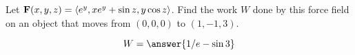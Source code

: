 \documentclass{ximera}
\author{David Guichard \and Neal Koblitz \and H. Jerome Keisler \and Albert Scheller \and Barry Balof \and Mike Wills \and Matthew Carr}
\begin{document}
\begin{exercise}




Let $\mathbf{F}(x,y,z)=\left\langle e^y,xe^y+\sin z,y\cos z\right\rangle$. Find the work $W$ done by this force field on an object that moves from $(0,0,0)$ to $(1,-1,3)$. 

\begin{prompt}
\[
W=\answer{1/e-\sin 3}
\]
\end{prompt}

\end{exercise}
\end{document}
